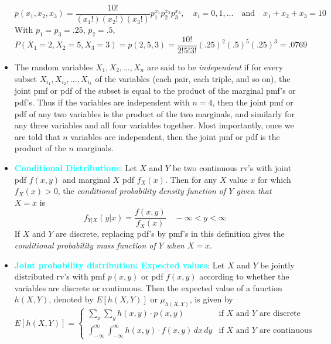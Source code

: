 \documentclass{report}
\begin{document}
\begin{itemize}
            \[
                p(x_1, x_2, x_3) = \frac{10!}{(x_1!)(x_2!)(x_3!)} p_1^{x_1} p_2^{x_2} p_3^{x_3}, \quad x_i = 0, 1, \ldots \quad \text{and} \quad x_1 + x_2 + x_3 = 10
            \]
            With \( p_1 = p_3 = .25 \), \( p_2 = .5 \),
            \[
                P(X_1 = 2, X_2 = 5, X_3 = 3) = p(2, 5, 3) = \frac{10!}{2! 5! 3!} (.25)^2 (.5)^5 (.25)^3 = .0769
            \]
        \item The random variables \( X_1, X_2, \ldots, X_n \) are said to be \textit{independent} if for every subset \( X_{i_1}, X_{i_2}, \ldots, X_{i_k} \) of the variables (each pair, each triple, and so on), the joint pmf or pdf of the subset is equal to the product of the marginal pmf's or pdf's.
            \bigbreak \noindent 
            Thus if the variables are independent with $n=4$, then the joint pmf or pdf of any two
            variables is the product of the two marginals, and similarly for any three variables and
            all four variables together. Most importantly, once we are told that $n$ variables are
            independent, then the joint pmf or pdf is the product of the $n$ marginals.
        \item \textbf{\textcolor{cyan}{Conditional Distributions}}:
            Let \( X \) and \( Y \) be two continuous rv’s with joint pdf \( f(x, y) \) and marginal \( X \) pdf \( f_X(x) \). Then for any \( X \) value \( x \) for which \( f_X(x) > 0 \), the \textit{conditional probability density function of \( Y \) given that \( X = x \)} is
            \[
                f_{Y|X}(y|x) = \frac{f(x, y)}{f_X(x)} \quad -\infty < y < \infty
            \]
            If \( X \) and \( Y \) are discrete, replacing pdf’s by pmf’s in this definition gives the \textit{conditional probability mass function of \( Y \) when \( X = x \)}.
        \item \textbf{\textcolor{cyan}{Joint probability distribution: Expected values}}:
            Let \( X \) and \( Y \) be jointly distributed rv's with pmf \( p(x, y) \) or pdf \( f(x, y) \) according to whether the variables are discrete or continuous. Then the expected value of a function \( h(X, Y) \), denoted by \( E[h(X, Y)] \) or \( \mu_{h(X, Y)} \), is given by
            \[
                E[h(X, Y)] =
                \begin{cases} 
                    \sum_{x} \sum_{y} h(x, y) \cdot p(x, y) & \text{if } X \text{ and } Y \text{ are discrete} \\[10pt]
                    \int_{-\infty}^{\infty} \int_{-\infty}^{\infty} h(x, y) \cdot f(x, y) \, dx \, dy & \text{if } X \text{ and } Y \text{ are continuous}

\end{cases}\]
\end{itemize}
\end{document}
